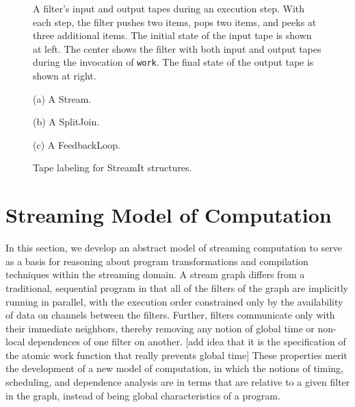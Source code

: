 \begin{figure}
\centering
{}
\caption{A filter's input and output tapes during an execution step.
With each step, the filter pushes two items, pops two items, and peeks
at three additional items.  The initial state of the input tape is
shown at left.  The center shows the filter with both input and output
tapes during the invocation of {\tt work}.  The final state of the
output tape is shown at right.}
\label{fig:tape}
\end{figure}

\begin{figure}
\centering
{}

(a) A Stream. \\
\vspace{8pt}

(b) A SplitJoin. \\
\vspace{8pt}

(c) A FeedbackLoop. \\
\vspace{8pt}
\caption{Tape labeling for StreamIt structures.}
\label{fig:tapelabels}
\end{figure}

\section{Streaming Model of Computation}

In this section, we develop an abstract model of streaming computation
to serve as a basis for reasoning about program transformations and
compilation techniques within the streaming domain.  A stream graph
differs from a traditional, sequential program in that all of the
filters of the graph are implicitly running in parallel, with the
execution order constrained only by the availability of data on
channels between the filters.  Further, filters communicate only with
their immediate neighbors, thereby removing any notion of global time
or non-local dependences of one filter on another.  [add idea that it
is the specification of the atomic work function that really prevents
global time] These properties merit the development of a new model of
computation, in which the notions of timing, scheduling, and
dependence analysis are in terms that are relative to a given filter
in the graph, instead of being global characteristics of a program.

